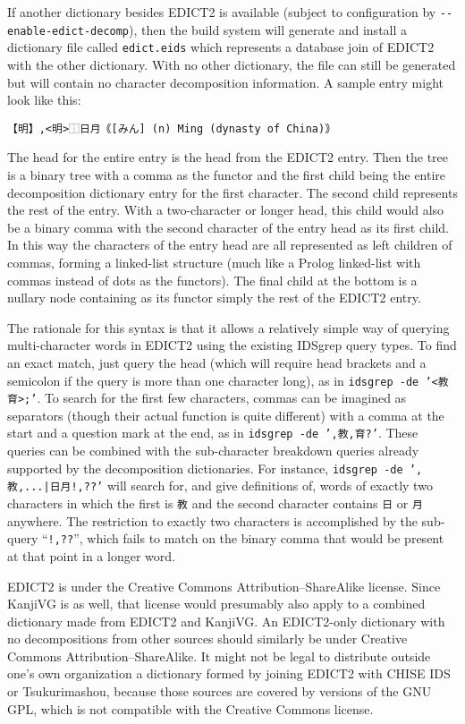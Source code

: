 \documentclass[twocolumn]{report}
\begin{document}
If another dictionary besides EDICT2 is available
(subject to configuration by \texttt{-{}-enable-edict-decomp}), then the
build system will generate and install a
dictionary file called \texttt{edict.eids} which represents a database
join of EDICT2 with the other dictionary.  With no other dictionary,
the file can still be generated but will contain no character decomposition
information.
A sample entry might look like this:
\begin{verbatim}
【明】,<明>⿰日月｟[みん] (n) Ming (dynasty of China)｠
\end{verbatim}

The head for the entire entry is the head from the EDICT2 entry.  Then the
tree is a binary tree with a comma as the functor and the first child being
the entire decomposition dictionary entry for the first character.  The
second child represents the rest of the entry.  With a two-character or
longer head, this child would also be a binary comma with the second
character of the entry head as its first child.  In this way the characters
of the entry head are all represented as left children of commas, forming a
linked-list structure (much like a Prolog linked-list with commas instead of
dots as the functors).  The final child at the bottom is a nullary node
containing as its functor simply the rest of the EDICT2 entry.

The rationale for this syntax is that it allows a relatively simple way of
querying multi-character words in EDICT2 using the existing IDSgrep query
types.  To find an exact match, just query the head (which will require head
brackets and a semicolon if the query is more than one character long), as
in \texttt{idsgrep -de '<教育>;'}.  To search for the first few characters,
commas can be imagined as separators (though their actual function is quite
different) with a comma at the start and a question mark at the end, as in
\texttt{idsgrep -de ',教,育?'}.  These queries can be combined with the
sub-character breakdown queries already supported by the decomposition
dictionaries.  For instance, \texttt{idsgrep -de ',教,...|日月!,??'} will
search for, and give definitions of, words of exactly two characters in
which the first is \texttt{教} and the second character contains \texttt{日}
or \texttt{月} anywhere.  The restriction to exactly two characters is
accomplished by the sub-query ``\texttt{!,??}'', which fails to match on the
binary comma that would be present at that point in a longer word.

EDICT2 is under the Creative Commons Attribution--ShareAlike license.  Since
KanjiVG is as well, that license would presumably also apply to a combined
dictionary made from EDICT2 and KanjiVG.  An EDICT2-only dictionary with no
decompositions from other sources should similarly be under Creative Commons
Attribution--ShareAlike.  It might not be legal to distribute outside one's
own organization a dictionary formed by joining EDICT2 with CHISE IDS or
Tsukurimashou, because those sources are covered by versions of the GNU GPL,
which is not compatible with the Creative Commons license.
\end{document}
